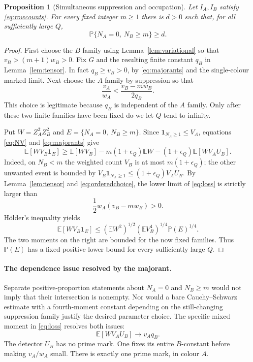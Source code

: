 \documentclass[11pt]{article}
\newtheorem{proposition}[theorem]{Proposition}
\theoremstyle{remark}
\numberwithin{equation}{section}
\newcommand{\E}{\mathbb E}
\newcommand{\PP}{\mathbb P}
\newcommand{\ind}{\mathbf 1}
\begin{document}
\begin{proposition}[Simultaneous suppression and occupation]
\label{prop:joint}
Let $I_A,I_B$ satisfy \eqref{eq:rowcounts}. For every fixed
integer $m\ge1$ there is $d>0$ such that, for all sufficiently
large $Q$,
\[
 \PP\{N_A=0,\ N_B\ge m\}\ge d.
\]
\end{proposition}
\begin{proof}
First choose the $B$ family using Lemma~\ref{lem:variational}
so that $v_B>(m+1)w_B>0$. Fix $G$ and the resulting finite
constant $q_B$ in Lemma~\ref{lem:tensor}.
In fact $q_B\ge v_B>0$, by \eqref{eq:majorants} and the
single-colour marked limit.
Next choose the $A$ family by suppression so that
\begin{equation}\label{eq:orderedchoice}
 \frac{v_A}{w_A}
     <\frac{v_B-mw_B}{2q_B}.
\end{equation}
This choice is legitimate because $q_B$ is independent of the
$A$ family.
Only after these two finite families have been fixed do we
let $Q$ tend to infinity.

Put $W=Z_A^2Z_B^2$ and
$E=\{N_A=0,\ N_B\ge m\}$.
Since $\ind_{N_A\ge1}\le V_A$, equations
\eqref{eq:NV} and \eqref{eq:majorants} give
\begin{equation}\label{eq:loss}
 \E[WV_B\ind_E]
 \ge \E[WV_B]-m(1+\epsilon_Q)\E W
       -(1+\epsilon_Q)\E[WV_AU_B].
\end{equation}
Indeed, on $N_B<m$ the weighted count $V_B$ is at most
$m(1+\epsilon_Q)$; the other unwanted event is bounded by
$V_B\ind_{N_A\ge1}\le(1+\epsilon_Q)V_AU_B$.
By Lemma~\ref{lem:tensor} and \eqref{eq:orderedchoice},
the lower limit of \eqref{eq:loss} is strictly larger than
\[
 \frac12w_A(v_B-mw_B)>0.
\]
H\"older's inequality yields
\[
 \E[WV_B\ind_E]
 \le(\E W^2)^{1/2}(\E V_B^4)^{1/4}\PP(E)^{1/4}.
\]
The two moments on the right are bounded for the now fixed
families. Thus $\PP(E)$ has a fixed positive lower bound for
every sufficiently large $Q$.
\end{proof}

\paragraph{The dependence issue resolved by the majorant.}
Separate positive-proportion statements about $N_A=0$ and
$N_B\ge m$ would not imply that their intersection is nonempty.
Nor would a bare Cauchy--Schwarz estimate with a fourth-moment
constant depending on the still-changing suppression family
justify the desired parameter choice.
The specific mixed moment in \eqref{eq:loss} resolves both issues:
\[
 \E[WV_AU_B]\longrightarrow v_Aq_B.
\]
The detector $U_B$ has no prime mark. One fixes its entire
$B$-constant before making $v_A/w_A$ small.
There is exactly one prime mark, in colour $A$.
\end{document}
